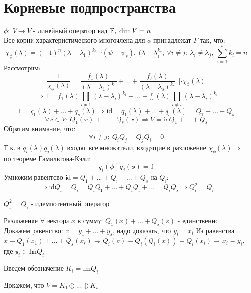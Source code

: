 \section{Корневые подпространства}
    $\phi:\ V \to V$ - линейный оператор над $\mathbb{F}, \ \dim V = n$\\
    Все корни характеристического многочлена для $\phi$ принадлежат $F$ так, что:
    $$\chi_\phi(\lambda) = (-1)^n(\lambda-\lambda_1)^{k_1} \cdots (\psi - \psi_s), \ (\lambda-\lambda_)^{k_s}, \ \forall i \neq j: \  \lambda_i \neq \lambda_j, \ \sum \limits_{i=1}^sk_i = n$$
    Рассмотрим: 
    $$\frac{1}{\chi_\phi(\lambda)} = \frac{f_1(\lambda)}{(\lambda-\lambda_1)^{k_1}} + ... + \frac{f_s(\lambda)}{(\lambda-\lambda_s)^{k_s}} \ \ | \cdot \chi_\phi(\lambda)$$ $$\Longrightarrow 1 = f_1 (\lambda) \prod\limits_{i\neq 1}(\lambda-\lambda_i)^{k_i} + ... + f_s (\lambda) \prod\limits_{i\neq s}(\lambda-\lambda_i)^{k_i}$$
    $$1= q_1(\lambda) + ... + q_s(\lambda) \Longrightarrow  \text{id} = q_1(\lambda) + ... + q_s(\lambda) = Q_1 + ... + Q_s$$
    $$\forall x \in V: \ Q_1(x) + ... + Q_s(x) \Longrightarrow V = \text{id} Q_1 + ... + Q_s$$
    Обратим внимание, что:
    $$\forall i \neq j: \ Q_iQ_j = Q_jQ_i = 0$$
    Т.к. в $q_i(\lambda)q_j(\lambda)$ входят все множители, входящие в разложение $\chi_\phi(\lambda) \Longrightarrow $ по теореме Гамильтона-Кэли: 
    $$q_i(\phi)q_j(\phi) = 0$$
    Умножим равентсво $\text{id} = Q_1+...+Q_i+...+Q_s$ на $Q_i:$ $$\Longrightarrow \text{id}Q_i = Q_i = Q_iQ_1+...+Q_iQ_i+...=Q_iQ_s \Longrightarrow Q_i^2 = Q_i$$
    \begin{definition}
        $Q_i^2 = Q_i$ - идемпотентный оператор
    \end{definition}  
    Разложение $\forall$ вектора $x$ в сумму: $Q_1(x) + ... + Q_s(x)$ - единственно\\
    Докажем равенство: $x = y_1+ ... + y_s$, надо доказать, что $y_i = x_i$
    Из равенства $x = Q_1(x_1) + ... + Q_s(x_s) \Longrightarrow Q_i(x) = Q_i(Q_i(x)) = Q_i(x_i) \Longrightarrow x_i = y_i$, где $y_i \in \text{Im}Q_i$
    
    Введем обозначение $K_i = \text{Im}Q_i$
    
    Докажем, что $V = K_1 \oplus ... \oplus K_s$
    
